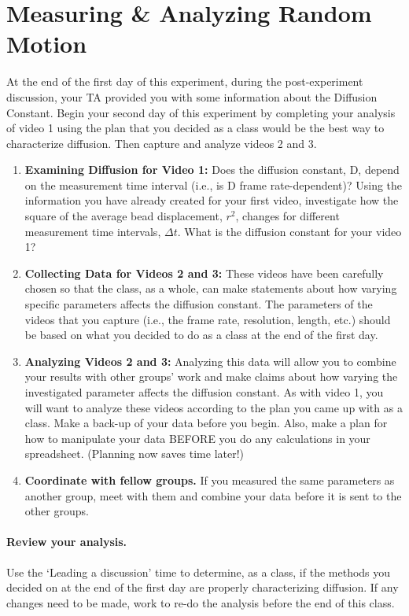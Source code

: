 \section{Measuring \& Analyzing Random Motion}
At the end of the first day of this experiment, during the post-experiment discussion, your TA provided you with some information about the Diffusion Constant. 
Begin your second day of this experiment by completing your analysis of video 1 using the plan that you decided as a class would be the best way to characterize diffusion.
Then capture and analyze videos 2 and 3.
\begin{enumerate}
\item \textbf{Examining Diffusion for Video 1:} Does the diffusion constant, D, depend on the measurement time interval (i.e., is D frame rate-dependent)? Using the information you have already created for your first video, investigate how the square of the average bead displacement, $r^{2}$, changes for different measurement time intervals, $\Delta t$. What is the diffusion constant for your video 1?
\item \textbf{Collecting Data for Videos 2 and 3:} These videos have been carefully chosen so that the class, as a whole, can make statements about how varying specific parameters affects the diffusion constant. The parameters of the videos that you capture (i.e., the frame rate, resolution, length, etc.) should be based on what you decided to do as a class at the end of the first day. 
\item \textbf{Analyzing Videos 2 and 3:} Analyzing this data will allow you to combine your results with other groups' work and make claims about how varying the investigated parameter affects the diffusion constant. As with video 1, you will want to analyze these videos according to the plan you came up with as a class. Make a back-up of your data before you begin. Also, make a plan for how to manipulate your data BEFORE you do any calculations in your spreadsheet. (Planning now saves time later!)
\item \textbf{Coordinate with fellow groups.} If you measured the same parameters as another group, meet with them and combine your data before it is sent to the other groups.
\end{enumerate}

\paragraph*{Review your analysis.} Use the `Leading a discussion' time to determine, as a class, if the methods you decided on at the end of the first day are properly characterizing diffusion. If any changes need to be made, work to re-do the analysis before the end of this class. 


